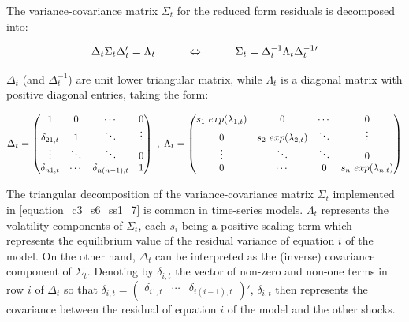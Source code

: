 The variance-covariance matrix $\Sigma_t$ for the reduced form residuals is decomposed into:

\begin{equation}
\Delta_t \Sigma_t \Delta_t'=\Lambda_t \hspace{10mm} \Leftrightarrow \hspace{10mm} \Sigma_t=\Delta_t^{-1} \Lambda_t \Delta_t^{-1}\phantom{}'
\label{equation_c3_s6_ss1_7} 
\end{equation}

$\Delta_t$ (and $\Delta_t^{-1}$) are unit lower triangular matrix, while $\Lambda_t$ is a diagonal matrix with positive diagonal entries, taking the form:

\begin{equation}
\Delta_t=\left( \begin{matrix} 1 & 0 & \cdots & 0 \\ \delta_{21,t} & 1 & \ddots & \vdots \\ \vdots & \ddots & \ddots & 0 \\ \delta_{n1,t} & \cdots & \delta_{n(n-1),t} & 1 \end{matrix} \right)
\hspace{1mm} , \hspace{1mm}
\Lambda_t=\left( \begin{matrix} s_1 \ exp(\lambda_{1,t}) & 0 & \cdots & 0 \\ 0 & s_2 \ exp(\lambda_{2,t}) & \ddots & \vdots \\ \vdots & \ddots & \ddots & 0 \\ 0 & \cdots & 0 & s_n \ exp(\lambda_{n,t}) \\ \end{matrix} \right)
\label{equation_c3_s6_ss1_8} 
\end{equation}

The triangular decomposition of the variance-covariance matrix $\Sigma_t$ implemented in \ref{equation_c3_s6_ss1_7} is common in time-series models. $\Lambda_t$ represents the volatility components of $\Sigma_t$, each $s_i$ being a positive scaling term which represents the equilibrium value of the residual variance of equation $i$ of the model. On the other hand, $\Delta_t$ can be interpreted as the (inverse) covariance component of $\Sigma_t$. Denoting by $\delta_{i,t}$ the vector of non-zero and non-one terms in row $i$ of $\Delta_t$ so that $\delta_{i,t} = ( \begin{matrix} \delta_{i1,t} & \cdots & \delta_{i(i-1),t} \end{matrix} )'$, $\delta_{i,t}$ then represents the covariance between the residual of equation $i$ of the model and the other shocks.

